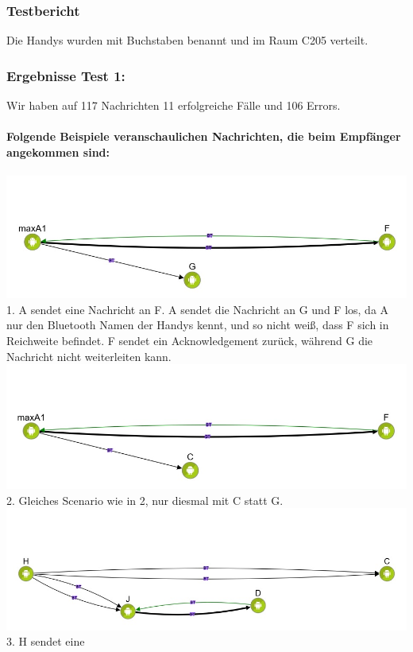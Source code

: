 \subsubsection{Testbericht}\label{testbericht}

Die Handys wurden mit Buchstaben benannt und im Raum C205 verteilt.

\subsubsection{Ergebnisse Test 1:}\label{ergebnisse-test-1}

Wir haben auf 117 Nachrichten 11 erfolgreiche Fälle und 106 Errors.
\\\\
\textbf{Folgende Beispiele veranschaulichen Nachrichten, die beim
Empfänger angekommen sind:}
\\\\
\includegraphics[width=1.0\textwidth]{belege/grosstests/Bilder/Erfolg4.jpg}\\
1. A sendet eine Nachricht an F. A sendet die Nachricht an G und F los, da A nur den
Bluetooth Namen der Handys kennt, und so nicht weiß, dass F sich in
Reichweite befindet. F sendet ein Acknowledgement zurück, während G die
Nachricht nicht weiterleiten kann.\\
\includegraphics[width=1.0\textwidth]{belege/grosstests/Bilder/Erfolg3.jpg}\\
2. Gleiches Scenario wie in 2, nur diesmal mit C statt G.\\
\includegraphics[width=1.0\textwidth]{belege/grosstests/Bilder/Erfolg2.jpg}\\ 3. H sendet eine
